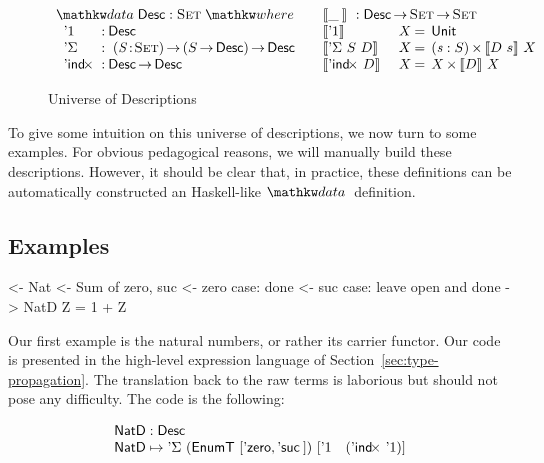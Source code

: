 \begin{figure*}

\[
\begin{array}{ll}
\stk{
\data \Desc : \Set \where \\
\;\;\begin{array}{@{}l@{\::\:}l@{\quad}l}
    \DUnit          & \Desc \\
    \DSigma         & \PI{\V{S}}{\Set} \PIS{S \To \Desc} \Desc \\
    \DIndx          & \Desc \To \Desc
\end{array}
}
&
\stk{
\descop{\_\:}{} : \Desc \To \Set \To \Set \\
\begin{array}{@{}ll@{\:=\:\:}ll}
\descop{\DUnit}{& X}        &  \Unit                                       \\
\descop{\DSigma{S}{D}}{& X} &  \SIGMAS{\V{s} : S}{\descop{D~s}{X}}         \\
\descop{\DIndx{D}}{& X}     &  \TIMES{X}{\descop{D}{X}}
\end{array}
}
\end{array}
\]


\caption{Universe of Descriptions}
\label{fig:desc_universe}

\end{figure*}

To give some intuition on this universe of descriptions, we now turn
to some examples. For obvious pedagogical reasons, we will manually
build these descriptions. However, it should be clear that, in
practice, these definitions can be automatically constructed an
Haskell-like $\data$ definition.

\subsection{Examples}

\begin{wstructure}
<- Nat
    <- Sum of zero, suc
    <- zero case: done
    <- suc case: leave open and done
    -> NatD Z = 1 + Z
\end{wstructure}

Our first example is the natural numbers, or rather its carrier
functor. Our code is presented in the high-level expression language
of Section~\ref{sec:type-propagation}. The translation back to the raw
terms is laborious but should not pose any difficulty. The code is the
following:

\[\stk{
\NatD : \Desc \\
\NatD \mapsto \DSigma{(\EnumT [ \NatZero, \NatSuc{} ])}
                     {[ \DUnit \quad (\DIndx{\DUnit}) ]}
}\]


